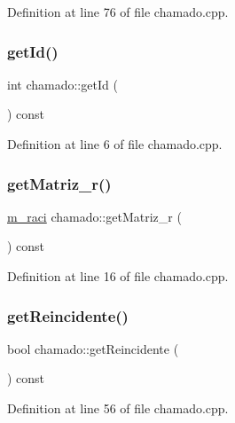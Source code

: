 Definition at line 76 of file chamado.\+cpp.

\hypertarget{classchamado_a9dbcaaf872f567f4cacffdac8b50e421}{}\label{classchamado_a9dbcaaf872f567f4cacffdac8b50e421} 
\subsubsection{\texorpdfstring{get\+Id()}{getId()}}
{\footnotesize\ttfamily int chamado\+::get\+Id (\begin{DoxyParamCaption}{ }\end{DoxyParamCaption}) const}



Definition at line 6 of file chamado.\+cpp.

\hypertarget{classchamado_a16ce4f32e682767e49bd59e56cd588eb}{}\label{classchamado_a16ce4f32e682767e49bd59e56cd588eb} 
\subsubsection{\texorpdfstring{get\+Matriz\+\_\+r()}{getMatriz\_r()}}
{\footnotesize\ttfamily \hyperlink{classm__raci}{m\+\_\+raci} chamado\+::get\+Matriz\+\_\+r (\begin{DoxyParamCaption}{ }\end{DoxyParamCaption}) const}



Definition at line 16 of file chamado.\+cpp.

\hypertarget{classchamado_a21fe1a9ee5a08266c83a267c14264093}{}\label{classchamado_a21fe1a9ee5a08266c83a267c14264093} 
\subsubsection{\texorpdfstring{get\+Reincidente()}{getReincidente()}}
{\footnotesize\ttfamily bool chamado\+::get\+Reincidente (\begin{DoxyParamCaption}{ }\end{DoxyParamCaption}) const}



Definition at line 56 of file chamado.\+cpp.

\hypertarget{classchamado_a6e7c7d33819bc728f095006eb47aaefa}{}\label{classchamado_a6e7c7d33819bc728f095006eb47aaefa} 
